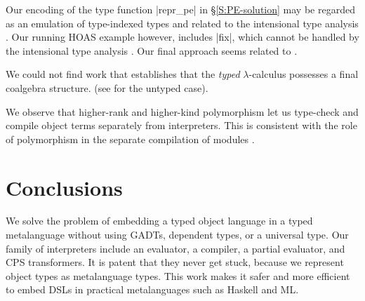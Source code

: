 Our encoding of the type function |repr_pe| in \S\ref{S:PE-solution}
may be regarded as an emulation of type-indexed types and related to
the intensional type analysis
\cite{Morrisett-intensional,Generic-Haskell}. Our running HOAS
example however, includes |fix|, which cannot be handled by the
intensional type analysis \cite{xi-guarded}.  Our final approach
seems related to \cite{Washburn-Weirich-boxes}.


We could not find work that establishes that
the \emph{typed} $\lambda$-calculus possesses a final coalgebra structure.
(see  for the untyped case).
\begin{comment}
\Citet{HonsellLenisa,honsell99coinductive}
investigate the untyped $\lambda$-calculus,
along this line.  
In particular, they use
contexts with a hole \cite[p.\,13]{honsell99coinductive} to define
\emph{observational equivalence}
(see \S\ref{selfinterp}).
\citearound{'s bibliography}\Citet{honsell99coinductive} refers to the
foundational work in this important area.  
Particularly intriguing is the link to the
coinductive aspects of B\"{o}hm trees, as pointed out by
\cite{berarducci-models} and \cite[Example 4.3.4]{jacobs-coalgebra}.
\end{comment}

\begin{comment}
One way to understand our main idea is to eschew sum types and sum kinds
for their dual, record types and record kinds.
For the self\hyp interpreter, we then proceed to use a Church encoding for
recursive data types \cite{bohm-automatic}.
\end{comment}

We observe that
higher-rank and higher-kind
polymorphism let us type-check and compile object terms separately from
interpreters.  This is consistent with the role of
polymorphism in the separate compilation of modules
\cite{shao-typed}.

\section{Conclusions}\label{conclusion}

We solve the problem of embedding a typed object language in a typed
metalanguage without using GADTs, dependent types, or a universal type.
Our family of interpreters include an evaluator, a compiler, a partial
evaluator, and CPS transformers.  It is patent that they never get stuck,
because we represent object types as metalanguage types.  This work
makes it safer and more efficient to embed %
DSLs
in practical metalanguages such as Haskell and ML\@.

